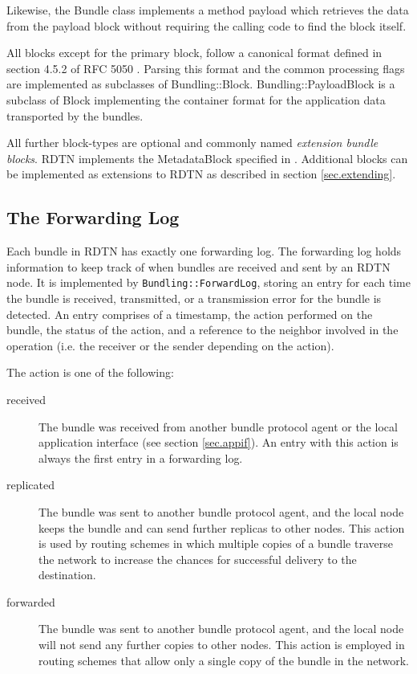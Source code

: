 \documentclass{article}
\begin{document}
Likewise, the Bundle class implements a method payload which retrieves the data
from the payload block without requiring the calling code to find the block
itself.

All blocks except for the primary block, follow a canonical format defined in
section 4.5.2 of RFC 5050 \cite{bundle-spec}. Parsing this format and the common
processing flags are implemented as subclasses of Bundling::Block.
Bundling::PayloadBlock is a subclass of Block implementing the container format
for the application data transported by the bundles.

All further block-types are optional and commonly named {\em extension bundle
blocks}. RDTN implements the MetadataBlock specified in \cite{metadata-block}.
Additional blocks can be implemented as extensions to RDTN as described in
section \ref{sec.extending}.

\subsection{The Forwarding Log}\label{sec.forward-log}

Each bundle in RDTN has exactly one forwarding log. The forwarding log holds
information to keep track of when bundles are received and sent by an RDTN node.
It is implemented by {\tt Bundling::ForwardLog}, storing an entry for each time
the bundle is received, transmitted, or a transmission error for the bundle is
detected. An entry comprises of a timestamp, the action performed on the bundle,
the status of the action, and a reference
to the neighbor involved in the operation (i.e. the receiver or the sender
depending on the action).

The action is one of the following:
\begin{description}

\item[received] The bundle was received from another bundle protocol agent or
the local application interface (see section \ref{sec.appif}). An entry with
this action is always the first entry in a forwarding log.

\item[replicated] The bundle was sent to another bundle protocol agent, and the
local node keeps the bundle and can send further replicas to other nodes. This
action is used by routing schemes in which multiple copies of a bundle traverse
the network to increase the chances for successful delivery to the destination.

\item[forwarded] The bundle was sent to another bundle protocol agent, and the
local node will not send any further copies to other nodes. This action is
employed in routing schemes that allow only a single copy of the bundle in the
network.

\end{description}
\end{document}
